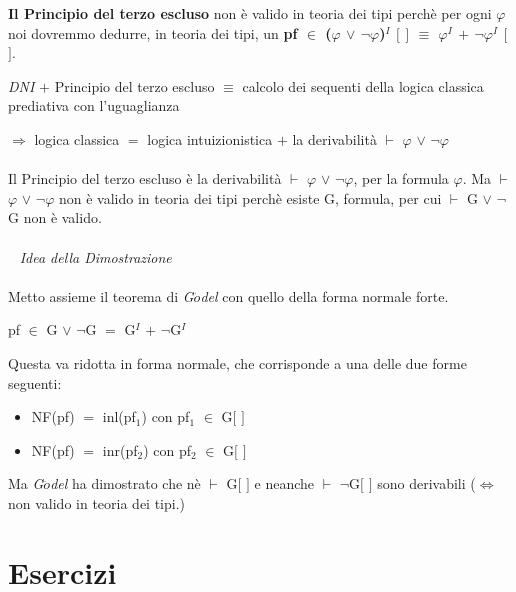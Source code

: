 \noindent
\textbf{Il Principio del terzo escluso} non \`e valido in teoria dei tipi perch\`e per ogni $\varphi$ noi dovremmo dedurre, in teoria dei tipi, un \textbf{pf $\in$ ($\varphi$ $\vee$ $\neg\varphi$)$^I$ $[$ $]$ $\equiv$ $\varphi^I$ $+$ $\neg\varphi^I$ $[$ $]$}. 
\begin{center}
\textit{DNI} $+$ Principio del terzo escluso $\equiv$ calcolo dei sequenti della logica classica prediativa con l'uguaglianza
\end{center}
\noindent
$\Rightarrow$ logica classica $=$ logica intuizionistica $+$ la derivabilit\`a $\vdash$ $\varphi$ $\vee$ $\neg\varphi$\\\\
\noindent
Il Principio del terzo escluso \`e la derivabilit\`a $\vdash$ $\varphi$ $\vee$ $\neg\varphi$, per la formula $\varphi$. Ma $\vdash$ $\varphi$ $\vee$ $\neg\varphi$ non \`e valido in teoria dei tipi perch\`e esiste G, formula, per cui $\vdash$ G $\vee$ $\neg$G non \`e valido.\\\\\
\noindent
\textit{Idea della Dimostrazione}\\\\
\noindent Metto assieme il teorema di \textit{G$\ddot{o}$del} con quello della forma normale forte.
\begin{center}pf $\in$ G $\vee$ $\neg$G $=$ G$^I$ $+$ $\neg$G$^I$\end{center}
Questa va ridotta in forma normale, che corrisponde a una delle due forme seguenti:
\begin{itemize}
\item NF(pf) $=$ inl(pf$_1$) con pf$_1$ $\in$ G$[$ $]$
\item NF(pf) $=$ inr(pf$_2$) con pf$_2$ $\in$ G$[$ $]$
\end{itemize}
Ma \textit{G$\ddot{o}$del} ha dimostrato che n\`e $\vdash$ G$[$ $]$ e neanche $\vdash$ $\neg$G$[$ $]$ sono derivabili ($\Leftrightarrow$ non valido in teoria dei tipi.)

\section{Esercizi}
\label{sec:cap10}
